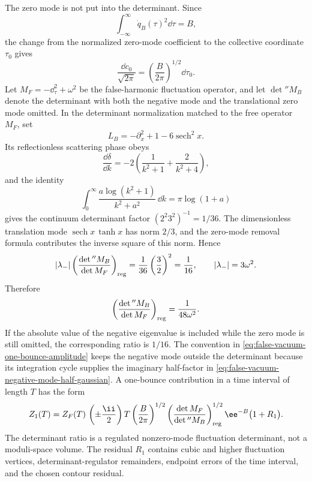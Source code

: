\begin{example}
The zero mode is not put into the determinant.  Since
\[
  \int_{-\infty}^{\infty}\dot q_B(\tau)^2\dd\tau=B,
\]
the change from the normalized zero-mode coefficient to the collective
coordinate \(\tau_0\) gives
\begin{equation}
  \frac{\dd c_0}{\sqrt{2\pi}}
  =
  \left(\frac{B}{2\pi}\right)^{1/2}\dd\tau_0 .
  \label{eq:false-vacuum-translation-zero-mode-jacobian}
\end{equation}
Let \(M_F=-\dd_\tau^2+\omega^2\) be the false-harmonic fluctuation operator,
and let \(\det{}''M_B\) denote the determinant with both the negative mode and
the translational zero mode omitted.  In the determinant normalization matched
to the free operator \(M_F\), set
\[
  L_B=-\partial_x^2+1-6\operatorname{sech}^2x .
\]
Its reflectionless scattering phase obeys
\[
  \frac{\dd\delta}{\dd k}
  =
  -2\left(\frac{1}{k^2+1}+\frac{2}{k^2+4}\right),
\]
and the identity
\[
  \int_0^\infty
  \frac{a\log(k^2+1)}{k^2+a^2}\,\dd k
  =
  \pi\log(1+a)
\]
gives the continuum determinant factor
\((2^2 3^2)^{-1}=1/36\).  The dimensionless translation mode
\(\operatorname{sech}x\,\tanh x\) has norm \(2/3\), and the zero-mode
removal formula contributes the inverse square of this norm.  Hence
\[
  |\lambda_-|
  \left(\frac{\det{}''M_B}{\det M_F}\right)_{\rm reg}
  =
  \frac{1}{36}\left(\frac32\right)^2
  =
  \frac{1}{16},
  \qquad |\lambda_-|=3\omega^2 .
\]
Therefore
\begin{equation}
  \left(\frac{\det{}''M_B}{\det M_F}\right)_{\rm reg}
  =
  \frac{1}{48\omega^2}.
  \label{eq:quartic-false-vacuum-positive-determinant-ratio}
\end{equation}
If the absolute value of the negative eigenvalue is included while the zero
mode is still omitted, the corresponding ratio is \(1/16\).  The convention in
\eqref{eq:false-vacuum-one-bounce-amplitude} keeps the negative mode outside
the determinant because its integration cycle supplies the imaginary
half-factor in
\eqref{eq:false-vacuum-negative-mode-half-gaussian}.  A one-bounce
contribution in a time interval of length \(T\) has the form
\begin{equation}
  Z_1(T)
  =
  Z_F(T)\,
  \left(\pm\frac{\ii}{2}\right)
  T
  \left(\frac{B}{2\pi}\right)^{1/2}
  \left(\frac{\det M_F}{\det{}'' M_B}\right)_{\rm reg}^{1/2}
  \ee^{-B}
  \bigl(1+R_1\bigr).
  \label{eq:false-vacuum-one-bounce-amplitude}
\end{equation}
The determinant ratio is a regulated nonzero-mode fluctuation determinant,
not a moduli-space volume.  The residual \(R_1\) contains cubic and higher
fluctuation vertices, determinant-regulator remainders, endpoint errors of the
time interval, and the chosen contour residual.
\end{example}

